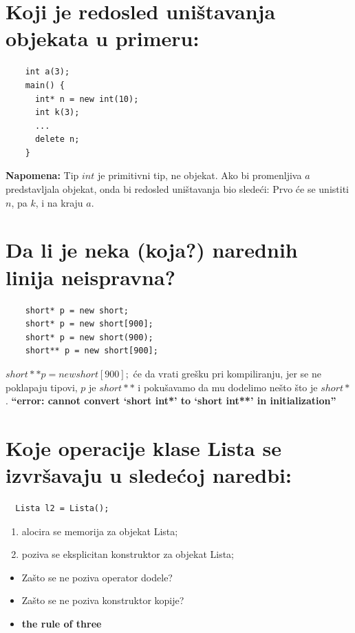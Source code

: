 \documentclass[a4paper]{article}
\begin{document}
\section{Koji je redosled uništavanja objekata u primeru:}
    \begin{lstlisting}
    int a(3);
    main() {
      int* n = new int(10);
      int k(3);
      ...
      delete n;
    }\end{lstlisting}
    \textbf{Napomena:} Tip $int$ je primitivni tip, ne objekat. Ako bi promenljiva $a$ predstavljala objekat, 
    onda bi redosled uništavanja bio sledeći: Prvo će se unistiti $n$, pa $k$, i na kraju $a$.

\section{Da li je neka (koja?) narednih linija neispravna?}
    \begin{lstlisting}
    short* p = new short;
    short* p = new short[900];
    short* p = new short(900);
    short** p = new short[900];\end{lstlisting}

    $short** p = new short[900];$ će da vrati grešku pri kompiliranju, jer se ne poklapaju tipovi, 
    $p$ je $short**$ i pokušavamo da mu dodelimo nešto što je $short*$.
    \textbf{“error: cannot convert ‘short int*’ to ‘short int**’ in initialization”}
 
\section{Koje operacije klase Lista se izvršavaju u sledećoj naredbi:}
  \begin{lstlisting}
  Lista l2 = Lista();\end{lstlisting}

    \begin{enumerate}
      \item alocira se memorija za objekat Lista;
      \item poziva se eksplicitan konstruktor za objekat Lista;
    \end{enumerate}
    \thinspace
    \begin{itemize}
      \item Zašto se ne poziva operator dodele?
      \item Zašto se ne poziva konstruktor kopije? \cite{gfg_copy_assignment}
            \cite{cppref_copy_assignment}
      \item \textbf{the rule of three} \cite{sof_rule_of_three}
    \end{itemize}
    
\end{document}

